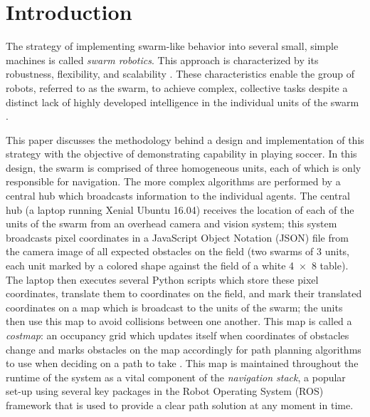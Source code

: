 \documentclass{article}
\begin{document}
     \section{Introduction}

     The strategy of implementing swarm-like behavior into several small, simple machines is called \textit{swarm robotics}. This approach is characterized by its robustness, flexibility, and scalability \cite{Sahin08}. These characteristics enable the group of robots, referred to as the swarm, to achieve complex, collective tasks despite a distinct lack of highly developed intelligence in the individual units of the swarm \cite{Zheng13}.
     \par This paper discusses the methodology behind a design and implementation of this strategy with the objective of demonstrating capability in playing soccer. In this design, the swarm is comprised of three homogeneous units, each of which is only responsible for navigation. The more complex algorithms are performed by a central hub which broadcasts information to the individual agents. The central hub (a laptop running Xenial Ubuntu 16.04) receives the location of each of the units of the swarm from an overhead camera and vision system; this system broadcasts pixel coordinates in a JavaScript Object Notation (JSON) file from the camera image of all expected obstacles on the field (two swarms of 3 units, each unit marked by a colored shape against the field of a white \SI{4x8}{\ft} table).
     The laptop then executes several Python scripts which store these pixel coordinates, translate them to coordinates on the field, and mark their translated coordinates on a map which is broadcast to the units of the swarm; the units then use this map to avoid collisions between one another. This map is called a \textit{costmap}: an occupancy grid which updates itself when coordinates of obstacles change and marks obstacles on the map accordingly for path planning algorithms to use when deciding on a path to take \cite{costmap_2d}. This map is maintained throughout the runtime of the system as a vital component of the \textit{navigation stack}, a popular set-up using several key packages in the Robot Operating System (ROS) framework that is used to provide a clear path solution at any moment in time.
\end{document}

